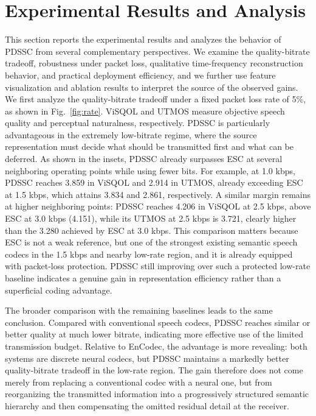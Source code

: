 \documentclass[conference]{IEEEtran}
\begin{document}
\section{Experimental Results and Analysis}
This section reports the experimental results and analyzes the behavior of PDSSC from several complementary perspectives. We examine the quality-bitrate tradeoff, robustness under packet loss, qualitative time-frequency reconstruction behavior, and practical deployment efficiency, and we further use feature visualization and ablation results to interpret the source of the observed gains.
We first analyze the quality-bitrate tradeoff under a fixed packet loss rate of 5\%, as shown in Fig.~\ref{fig:rate}. ViSQOL and UTMOS measure objective speech quality and perceptual naturalness, respectively. PDSSC is particularly advantageous in the extremely low-bitrate regime, where the source representation must decide what should be transmitted first and what can be deferred. As shown in the insets, PDSSC already surpasses ESC at several neighboring operating points while using fewer bits. For example, at 1.0 kbps, PDSSC reaches 3.859 in ViSQOL and 2.914 in UTMOS, already exceeding ESC at 1.5 kbps, which attains 3.834 and 2.861, respectively. A similar margin remains at higher neighboring points: PDSSC reaches 4.206 in ViSQOL at 2.5 kbps, above ESC at 3.0 kbps (4.151), while its UTMOS at 2.5 kbps is 3.721, clearly higher than the 3.280 achieved by ESC at 3.0 kbps. This comparison matters because ESC is not a weak reference, but one of the strongest existing semantic speech codecs in the 1.5 kbps and nearby low-rate region, and it is already equipped with packet-loss protection. PDSSC still improving over such a protected low-rate baseline indicates a genuine gain in representation efficiency rather than a superficial coding advantage.

The broader comparison with the remaining baselines leads to the same conclusion. Compared with conventional speech codecs, PDSSC reaches similar or better quality at much lower bitrate, indicating more effective use of the limited transmission budget. Relative to EnCodec, the advantage is more revealing: both systems are discrete neural codecs, but PDSSC maintains a markedly better quality-bitrate tradeoff in the low-rate region. The gain therefore does not come merely from replacing a conventional codec with a neural one, but from reorganizing the transmitted information into a progressively structured semantic hierarchy and then compensating the omitted residual detail at the receiver.
\end{document}
